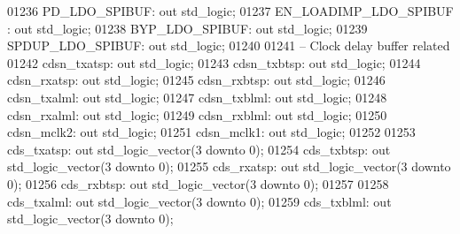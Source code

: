 \begin{DoxyCode}
01236         PD\_LDO\_SPIBUF:  \textcolor{keywordflow}{out} \textcolor{comment}{std\_logic};
01237         EN\_LOADIMP\_LDO\_SPIBUF : \textcolor{keywordflow}{out} \textcolor{comment}{std\_logic};
01238         BYP\_LDO\_SPIBUF: \textcolor{keywordflow}{out} \textcolor{comment}{std\_logic};
01239         SPDUP\_LDO\_SPIBUF:   \textcolor{keywordflow}{out} \textcolor{comment}{std\_logic};
01240         
01241 \textcolor{keyword}{        -- Clock delay buffer related}
01242         cdsn\_txatsp:    \textcolor{keywordflow}{out} \textcolor{comment}{std\_logic};
01243         cdsn\_txbtsp:    \textcolor{keywordflow}{out} \textcolor{comment}{std\_logic};
01244         cdsn\_rxatsp:    \textcolor{keywordflow}{out} \textcolor{comment}{std\_logic};
01245         cdsn\_rxbtsp:    \textcolor{keywordflow}{out} \textcolor{comment}{std\_logic};
01246         cdsn\_txalml:    \textcolor{keywordflow}{out} \textcolor{comment}{std\_logic};
01247         cdsn\_txblml:    \textcolor{keywordflow}{out} \textcolor{comment}{std\_logic};
01248         cdsn\_rxalml:    \textcolor{keywordflow}{out} \textcolor{comment}{std\_logic};
01249         cdsn\_rxblml:    \textcolor{keywordflow}{out} \textcolor{comment}{std\_logic};
01250         cdsn\_mclk2: \textcolor{keywordflow}{out} \textcolor{comment}{std\_logic};
01251         cdsn\_mclk1: \textcolor{keywordflow}{out} \textcolor{comment}{std\_logic};
01252          
01253         cds\_txatsp: \textcolor{keywordflow}{out} \textcolor{comment}{std\_logic\_vector}(\textcolor{vhdllogic}{}\textcolor{vhdllogic}{3} \textcolor{keywordflow}{downto} \textcolor{vhdllogic}{}\textcolor{vhdllogic}{0});
01254         cds\_txbtsp: \textcolor{keywordflow}{out} \textcolor{comment}{std\_logic\_vector}(\textcolor{vhdllogic}{}\textcolor{vhdllogic}{3} \textcolor{keywordflow}{downto} \textcolor{vhdllogic}{}\textcolor{vhdllogic}{0});
01255         cds\_rxatsp: \textcolor{keywordflow}{out} \textcolor{comment}{std\_logic\_vector}(\textcolor{vhdllogic}{}\textcolor{vhdllogic}{3} \textcolor{keywordflow}{downto} \textcolor{vhdllogic}{}\textcolor{vhdllogic}{0});
01256         cds\_rxbtsp: \textcolor{keywordflow}{out} \textcolor{comment}{std\_logic\_vector}(\textcolor{vhdllogic}{}\textcolor{vhdllogic}{3} \textcolor{keywordflow}{downto} \textcolor{vhdllogic}{}\textcolor{vhdllogic}{0});
01257          
01258         cds\_txalml: \textcolor{keywordflow}{out} \textcolor{comment}{std\_logic\_vector}(\textcolor{vhdllogic}{}\textcolor{vhdllogic}{3} \textcolor{keywordflow}{downto} \textcolor{vhdllogic}{}\textcolor{vhdllogic}{0});
01259         cds\_txblml: \textcolor{keywordflow}{out} \textcolor{comment}{std\_logic\_vector}(\textcolor{vhdllogic}{}\textcolor{vhdllogic}{3} \textcolor{keywordflow}{downto} \textcolor{vhdllogic}{}\textcolor{vhdllogic}{0});

\end{DoxyCode}
